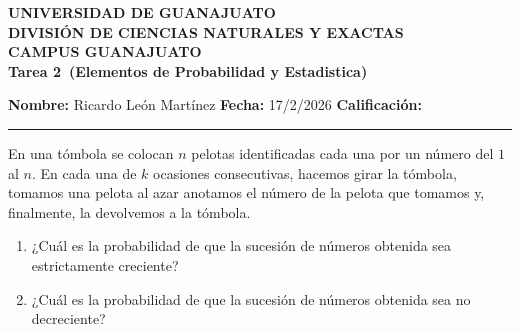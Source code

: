 \message{ !name(tarea2.tex)}\documentclass[12pt,a4paper]{article}
\newcommand{\alumno}{Ricardo León Martínez}
\newcommand{\materia}{Elementos de Probabilidad y Estadistica}
\newcommand{\tarea}{Tarea 2}
\newcommand{\fecha}{17/2/2026}
\begin{document}


    \begin{center}
        {\large\textbf{UNIVERSIDAD DE GUANAJUATO}}\\[0.3cm]
        {\normalsize\textbf{DIVISIÓN DE CIENCIAS NATURALES Y EXACTAS}}\\
        {\normalsize\textbf{CAMPUS GUANAJUATO}}\\[1cm]

        {\Large\textbf{\tarea\ (\materia)}}\\[1cm]
    \end{center}

    \noindent
    \textbf{Nombre:} \alumno 
    \hfill 
    \textbf{Fecha:} \fecha 
    \hfill 
    \textbf{Calificación:} \rule{3cm}{0.4pt}

    \vspace{0.3cm}

    \begin{mdframed}[style=mdbluebox,frametitle={Ejercicio 1}]
        En una tómbola se colocan $n$ pelotas identificadas cada una por un número del $1$ al $n$. 
        En cada una de $k$ ocasiones consecutivas, hacemos girar la tómbola, tomamos una pelota al azar 
        anotamos el número de la pelota que tomamos y, finalmente, la devolvemos a la tómbola.
        \begin{enumerate}
            \item[(a)] ¿Cuál es la probabilidad de que la sucesión de números obtenida sea estrictamente creciente?
            \item[(b)] ¿Cuál es la probabilidad de que la sucesión de números obtenida sea no decreciente?
        \end{enumerate}
    \end{mdframed}
\end{document}
